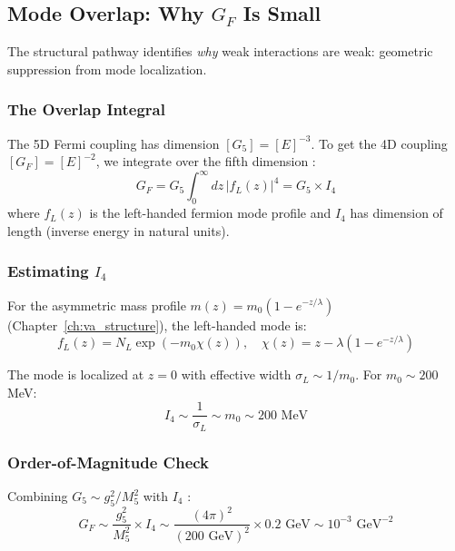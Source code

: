 \subsection{Mode Overlap: Why $G_F$ Is Small}
\label{sec:ch11_overlap}

The structural pathway identifies \emph{why} weak interactions are weak:
geometric suppression from mode localization.

\subsubsection{The Overlap Integral}

The 5D Fermi coupling has dimension $[G_5] = [E]^{-3}$. To get the 4D coupling
$[G_F] = [E]^{-2}$, we integrate over the fifth dimension \tagDc{}:
\begin{equation}
    G_F = G_5 \int_0^\infty dz \, |f_L(z)|^4 = G_5 \times I_4
    \label{eq:ch11_overlap}
\end{equation}
where $f_L(z)$ is the left-handed fermion mode profile and $I_4$ has dimension
of length (inverse energy in natural units).

\subsubsection{Estimating $I_4$}

For the asymmetric mass profile $m(z) = m_0(1 - e^{-z/\lambda})$
(Chapter~\ref{ch:va_structure}), the left-handed mode is:
\begin{equation}
    f_L(z) = N_L \exp\left(-m_0\chi(z)\right), \quad
    \chi(z) = z - \lambda(1 - e^{-z/\lambda})
    \label{eq:ch11_fL}
\end{equation}

The mode is localized at $z = 0$ with effective width $\sigma_L \sim 1/m_0$.
For $m_0 \sim 200$ MeV:
\begin{equation}
    I_4 \sim \frac{1}{\sigma_L} \sim m_0 \sim 200 \text{ MeV}
    \label{eq:ch11_I4_estimate}
\end{equation}

\subsubsection{Order-of-Magnitude Check}

Combining $G_5 \sim g_5^2/M_5^2$ with $I_4$ \tagP{}:
\begin{equation}
    G_F \sim \frac{g_5^2}{M_5^2} \times I_4
    \sim \frac{(4\pi)^2}{(200 \text{ GeV})^2} \times 0.2 \text{ GeV}
    \sim 10^{-3} \text{ GeV}^{-2}
    \label{eq:ch11_GF_estimate}
\end{equation}

